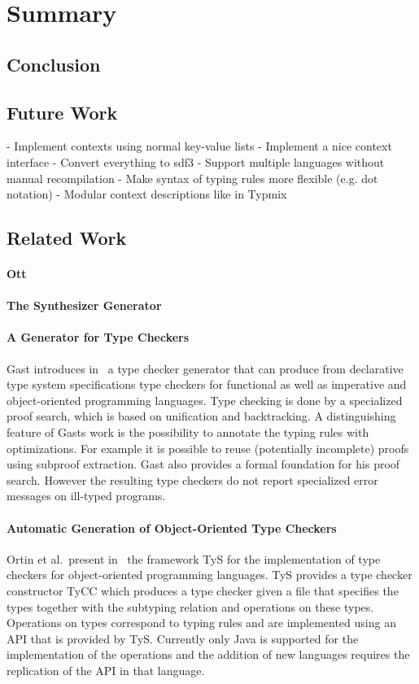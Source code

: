 \chapter{Summary}
\section{Conclusion}
\section{Future Work}
- Implement contexts using normal key-value lists
- Implement a nice context interface
- Convert everything to sdf3
- Support multiple languages without manual recompilation
- Make syntax of typing rules more flexible (e.g. dot notation)
- Modular context descriptions like in Typmix
\section{Related Work}
\subsubsection{Ott}
\subsubsection{The Synthesizer Generator}
\subsubsection{A Generator for Type Checkers}
Gast introduces in~\cite{gast2005generator} a type checker generator
that can produce from declarative type system specifications type
checkers for functional as well as imperative and object-oriented
programming languages. Type checking is done by a specialized proof
search, which is based on unification and backtracking. A
distinguishing feature of Gasts work is the possibility to annotate
the typing rules with optimizations. For example it is possible to
reuse (potentially incomplete) proofs using subproof extraction. Gast
also provides a formal foundation for his proof search. However the
resulting type checkers do not report specialized error messages on
ill-typed  programs.

\subsubsection{Automatic Generation of Object-Oriented Type Checkers}
Ortin et al.\ present in~\cite{ortin2014automatic} the framework TyS
for the implementation of type checkers for object-oriented
programming languages. TyS provides a type checker constructor TyCC
which produces a type checker given a file that specifies the types
together with the subtyping relation and operations on these
types. Operations on types correspond to typing rules and are
implemented using an API that is provided by TyS. Currently only Java
is supported for the implementation of the operations and the addition
of new languages requires the replication of the API in that
language.

